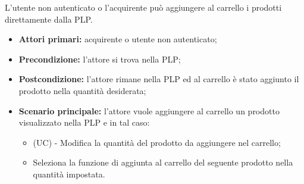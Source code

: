 
L'utente non autenticato o l'acquirente può aggiungere al carrello i prodotti direttamente dalla PLP.
\begin{itemize}
    \item \textbf{Attori primari:} acquirente o utente non autenticato;
    \item \textbf{Precondizione:} l'attore si trova nella PLP;
    \item \textbf{Postcondizione:} l'attore rimane nella PLP ed al carrello è stato aggiunto il prodotto nella quantità desiderata;
    \item \textbf{Scenario principale:} l'attore vuole aggiungere al carrello un prodotto visualizzato nella PLP e in tal caso:
    \begin{itemize}
        \item (UC) - Modifica la quantità del prodotto da aggiungere nel carrello;
        \item Seleziona la funzione di aggiunta al carrello del seguente prodotto nella quantità impostata.
    \end{itemize}
\end{itemize}